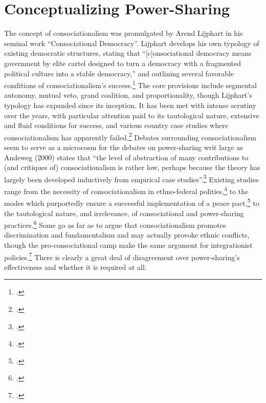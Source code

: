 \documentclass[12pt]{article}
\begin{document}
\section{Conceptualizing Power-Sharing} 
The concept of consociationalism was promulgated by Arend Lijphart in his seminal work ``Consociational Democracy''. Lijphart develops his own typology of existing democratic structures, stating that ``[c]onsociational democracy means government by elite cartel designed to turn a democracy with a fragmented political culture into a stable democracy,'' and outlining several favorable conditions of consociationalism’s success.\footcite[216]{lijphart_consociational_1969} The core provisions include segmental autonomy, mutual veto, grand coalition, and proportionality, though Lijphart's typology has expanded since its inception. It has been met with intense scrutiny over the years, with particular attention paid to its tautological nature, extensive and fluid conditions for success, and various country case studies where consociationalism has apparently failed.\footcite{andeweg_consociational_2000, bogaards_favourable_1998, seaver_regional_2000, tull_hidden_2005} Debates surrounding consociationalism seem to serve as a microcosm for the debates on power-sharing writ large as Andeweg (2000) states that ``the level of abstraction of many contributions to (and critiques of) consociationalism is rather low, perhaps because the theory has largely been developed inductively from empirical case studies''.\footcite[531]{andeweg_consociational_2000} Existing studies range from the necessity of consociationalism in ethno-federal polities,\footcite{lijphart_consociational_1969, lijphart_consociational_1977, oleary_debating_2005} to the modes which purportedly ensure a successful implementation of a peace pact,\footcite{walter_committing_2002, walter_explaining_2003, hartzell_institutionalizing_2003, hoddie_civil_2003, mukherjee_why_2006} to the tautological nature, and irrelevance, of consociational and power-sharing practices.\footcite{andeweg_consociational_2000, bogaards_favourable_1998, roeder_sustainable_2003} Some go as far as to argue that consociationalism promotes discrimination and fundamentalism and may actually provoke ethnic conflicts, though the pro-consociational camp make the same argument for integrationist policies.\footcite{oleary_debating_2005} There is clearly a great deal of disagreement over power-sharing’s effectiveness and whether it is required at all. 
\end{document}
